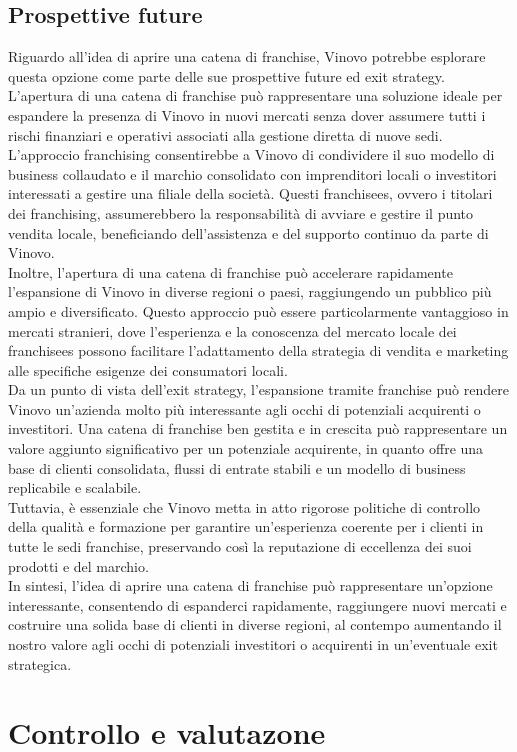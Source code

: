 \documentclass[12pt, a4paper]{article}
\newcommand{\meskip}{\medskip \\}
\begin{document}
\subsection{Prospettive future}
Riguardo all'idea di aprire una catena di franchise, Vinovo potrebbe esplorare questa opzione come parte delle sue prospettive future ed exit strategy. L'apertura di una catena di franchise può rappresentare una soluzione ideale per espandere la presenza di Vinovo in nuovi mercati senza dover assumere tutti i rischi finanziari e operativi associati alla gestione diretta di nuove sedi.\meskip
L'approccio franchising consentirebbe a Vinovo di condividere il suo modello di business collaudato e il marchio consolidato con imprenditori locali o investitori interessati a gestire una filiale della società. Questi franchisees, ovvero i titolari dei franchising, assumerebbero la responsabilità di avviare e gestire il punto vendita locale, beneficiando dell'assistenza e del supporto continuo da parte di Vinovo.\meskip
Inoltre, l'apertura di una catena di franchise può accelerare rapidamente l'espansione di Vinovo in diverse regioni o paesi, raggiungendo un pubblico più ampio e diversificato. Questo approccio può essere particolarmente vantaggioso in mercati stranieri, dove l'esperienza e la conoscenza del mercato locale dei franchisees possono facilitare l'adattamento della strategia di vendita e marketing alle specifiche esigenze dei consumatori locali.\meskip
Da un punto di vista dell'exit strategy, l'espansione tramite franchise può rendere Vinovo un'azienda molto più interessante agli occhi di potenziali acquirenti o investitori. Una catena di franchise ben gestita e in crescita può rappresentare un valore aggiunto significativo per un potenziale acquirente, in quanto offre una base di clienti consolidata, flussi di entrate stabili e un modello di business replicabile e scalabile.\meskip
Tuttavia, è essenziale che Vinovo metta in atto rigorose politiche di controllo della qualità e formazione per garantire un'esperienza coerente per i clienti in tutte le sedi franchise, preservando così la reputazione di eccellenza dei suoi prodotti e del marchio.\meskip
In sintesi, l'idea di aprire una catena di franchise può rappresentare un'opzione interessante, consentendo di espanderci rapidamente, raggiungere nuovi mercati e costruire una solida base di clienti in diverse regioni, al contempo aumentando il nostro valore agli occhi di potenziali investitori o acquirenti in un'eventuale exit strategica.

\section{Controllo e valutazone}
\end{document}
